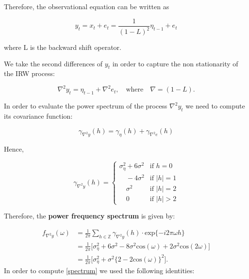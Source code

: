 \documentclass{article}\usepackage[]{graphicx}\usepackage[]{color}
\begin{document}
Therefore, the observational equation can be written as

\begin{equation*}
\boxed{
y_t = x_t + e_t = \frac{1}{(1 - L)^2} \eta_{t-1} + {e_t}
}
\end{equation*}

where L is the backward shift operator. 

We take the second differences of $y_t$ in order to capture the non stationarity of the IRW process:

\begin{equation*}
\nabla^2 y_t = \eta_{t-1} + \nabla^2 e_t, \quad \text{where} \quad \nabla = (1 -L).
\end{equation*}

In order to evaluate the power spectrum of the process $\nabla^2 y_t$ we need to compute its covariance function:



\begin{equation*}
\gamma_{\nabla^2 y}(h)  = \gamma_{\eta}(h) + \gamma_{\nabla^2 e}(h)
\end{equation*}

Hence,


\[ 
\gamma_{\nabla^2 y}(h) = 
  \begin{cases}
  \sigma^2_{\eta} + 6 \sigma^2 & \text{if } h = 0 \\
  \quad -4 \sigma^2                  & \text{if } |h| = 1 \\
  \quad \sigma^2                     & \text{if } |h| = 2 \\
  \quad 0                            & \text{if } |h| > 2
  \end{cases}
\]


Therefore, the \textbf{power frequency spectrum} is given by:

\begin{equation} \label{spectrum}
\begin{split}
f_{\nabla^2 y}(\omega) & = \frac{1}{2 \pi} \sum_{h \in \mathbb{Z}} \gamma_{\nabla^2 y}(h) \cdot \text{exp}\{-i2\pi\omega h\} \\
 & = \frac{1}{2\pi} \Big[  \sigma^2_{\eta} + 6\sigma^2 - 8\sigma^2 \text{cos}(\omega) + 2\sigma^2 \text{cos}(2\omega) \Big] \\
 & = \frac{1}{2\pi} \Big[ \sigma^2_{\eta} + \sigma^2 \{ 2 - 2\text{cos}(\omega)\}^2 \Big].
\end{split}
\end{equation}
In order to compute \eqref{spectrum} we used the following identities: 
\end{document}
